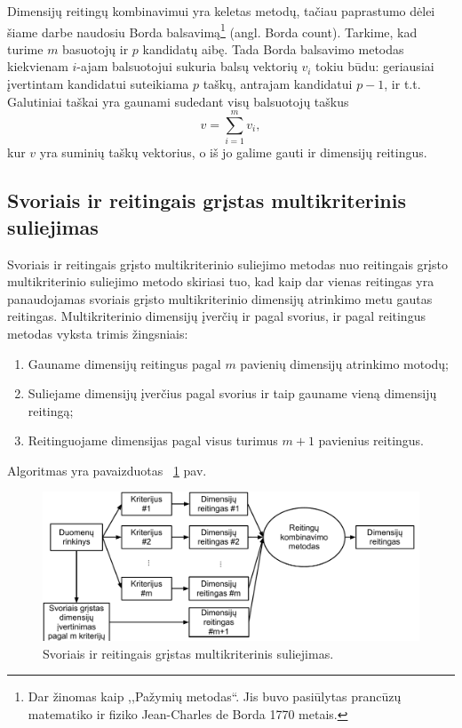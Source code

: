 Dimensijų reitingų kombinavimui yra keletas metodų\cite{dwork2001rank}, tačiau
paprastumo dėlei šiame darbe naudosiu Borda balsavimą\footnote{Dar žinomas kaip
,,Pažymių metodas``. Jis buvo pasiūlytas prancūzų matematiko ir fiziko 
Jean-Charles de Borda 1770 metais.} (angl. Borda count). Tarkime, kad turime
$m$ basuotojų ir $p$ kandidatų aibę. Tada Borda balsavimo metodas kiekvienam
$i$-ajam balsuotojui sukuria balsų vektorių $v_i$ tokiu būdu: geriausiai 
įvertintam kandidatui suteikiama $p$ taškų, antrajam kandidatui $p-1$, ir t.t.
Galutiniai taškai yra gaunami sudedant visų balsuotojų taškus
\begin{equation}
 v = \sum_{i=1}^m v_i,
\end{equation}
kur $v$ yra suminių taškų vektorius, o iš jo galime gauti ir dimensijų reitingus.

\subsection{Svoriais ir reitingais grįstas multikriterinis suliejimas}

Svoriais ir reitingais grįsto multikriterinio suliejimo metodas
nuo reitingais grįsto multikriterinio suliejimo metodo skiriasi tuo, kad kaip dar vienas 
reitingas yra panaudojamas svoriais grįsto multikriterinio dimensijų atrinkimo metu
gautas reitingas.
Multikriterinio dimensijų įverčių ir pagal svorius, ir pagal reitingus metodas vyksta trimis
žingsniais:
\begin{enumerate}
  \item Gauname dimensijų reitingus pagal $m$ pavienių dimensijų atrinkimo motodų;
  \item Suliejame dimensijų įverčius pagal svorius ir taip gauname vieną 
  dimensijų reitingą;
  \item Reitinguojame dimensijas pagal visus turimus $m+1$ pavienius reitingus.
\end{enumerate} 
Algoritmas yra pavaizduotas ~\ref{fig:figure3} pav.
\begin{figure}
 \centering
 \includegraphics[width=1\textwidth]{images/score_and_ranking_based_fusion.pdf}
 \caption{Svoriais ir reitingais grįstas multikriterinis suliejimas.}
 \label{fig:figure3}
\end{figure}

